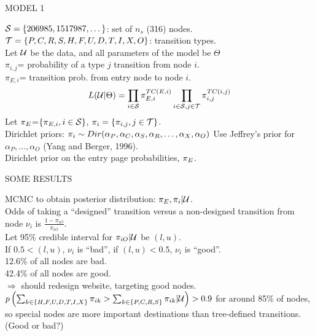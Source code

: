 \documentclass{report}
\newcommand{\head}[1]
{
  \begin{center}
      {\huge {\color{blue} #1}}
    \end{center}
  }
\newcommand{\bpi}{{\bf \pi}}
\newcommand{\datU}{{\cal U}}
\newcommand{\nodeS}{{\cal S}}
\newcommand{\nodeT}{{\cal T}}
\newcommand{\nodeD}{{\cal D}}
\newcommand{\nodeA}{{\cal A}}
\newcommand{\Snodelist}{{\alpha_P,\alpha_C,\alpha_S,\alpha_R,\dots,\alpha_X,\alpha_O}}
\newcommand{\Snodetrunc}{{\alpha_P,\dots,\alpha_O}} %
\begin{document}
\newpage \head{MODEL 1}
$\nodeS=\{206985, 1517987,\dots\}$: set of $n_s$ (316) nodes.\\
$\nodeT=\{P,C, R, S, H, F, U, D, T, I, X, O\}$: transition types.\\
Let $\datU$ be the data, and all parameters of the model be $\Theta$\\
$\pi_{i,j}$= probability of a type $j$ transition from node $i$.\\
$\pi_{E,i}$= transition prob. from entry node to node $i$.
\begin{equation*}
  L(\datU | \Theta)= \prod_{i \in \nodeS} \pi_{E,i}^{TC(E,i)} \prod_{i \in \nodeS,j \in \nodeT} \pi_{i,j}^{TC(i,j)}
\end{equation*}
Let $\bpi_E$=$\{\pi_{E,i}, i \in \nodeS\}$, $\bpi_i=\{\pi_{i,j}, j \in \nodeT\}$.
\\Dirichlet priors: $\bpi_i  \sim Dir (\Snodelist)$
Use Jeffrey's prior for $\Snodetrunc$ (Yang and Berger, 1996).\\
Dirichlet prior on the entry page probabilities, $\bpi_E$.

\newpage \head{SOME RESULTS} %
MCMC to obtain posterior distribution: $\bpi_E,\bpi_i|\datU$.\\
Odds of taking a ``designed'' transition versus a non-designed
transition from node $\nu_i$ is $\frac{1-\pi_{iO}}{\pi_{iO}}$.\\
Let 95\% credible interval for $\pi_{iO}|\datU$ be $(l,u)$.\\
If $0.5 < (l,u)$, $\nu_i$ is ``bad'', if $ (l,u) < 0.5$, $\nu_i$ is ``good''.\\
12.6\% of all nodes are bad.\\
42.4\% of all nodes are good.\\
\indent $\Rightarrow$ should redesign website, targeting good nodes.\\
$ p\left( \sum_{k\in \{H, F, U, D, T, I, X\}}\pi_{ik}>\sum_{k\in \{P,C, R, S\}}\pi_{ik}|\datU\right)>0.9$ for around 85\% of nodes, so special nodes are more important destinations than tree-defined transitions. (Good or bad?)
\end{document}
